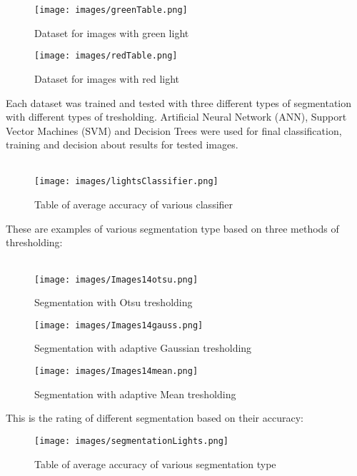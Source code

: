 \documentclass{article}
\begin{document}
\begin{figure}[!htbp]
    \centering
    \texttt{[image: images/greenTable.png]}
    \caption{Dataset for images with green light}
\end{figure}

\begin{figure}[!htbp]
    \centering
    \texttt{[image: images/redTable.png]}
    \caption{Dataset for images with red light}
\end{figure}

Each dataset was trained and tested with three different types of segmentation with different types of tresholding. Artificial Neural Network (ANN), Support Vector Machines (SVM) and Decision Trees were used for final classification, training and decision about results for tested images.\\\

\begin{figure}[!htbp]
    \centering
    \texttt{[image: images/lightsClassifier.png]}
    \caption{Table of average accuracy of various classifier }
\end{figure}

These are examples of various segmentation type based on three methods of thresholding:\\\\
\begin{figure}[!htbp]
  \begin{minipage}[b]{0.3\linewidth}
    \centering
    \texttt{[image: images/Images14otsu.png]}
    \caption{Segmentation with Otsu tresholding}
  \end{minipage}
  \hspace{0.3cm}
  \begin{minipage}[b]{0.3\linewidth}
    \centering
    \texttt{[image: images/Images14gauss.png]}
    \caption{Segmentation with adaptive Gaussian tresholding}
  \end{minipage}
  \hspace{0.3cm}
    \begin{minipage}[b]{0.3\linewidth}
    \centering
    \texttt{[image: images/Images14mean.png]}
    \caption{Segmentation with adaptive Mean tresholding}
  \end{minipage}
\end{figure}

This is the rating of different segmentation based on their accuracy:
\begin{figure}[!htbp]
    \centering
    \texttt{[image: images/segmentationLights.png]}
    \caption{Table of average accuracy of various segmentation type}
\end{figure}
\end{document}

